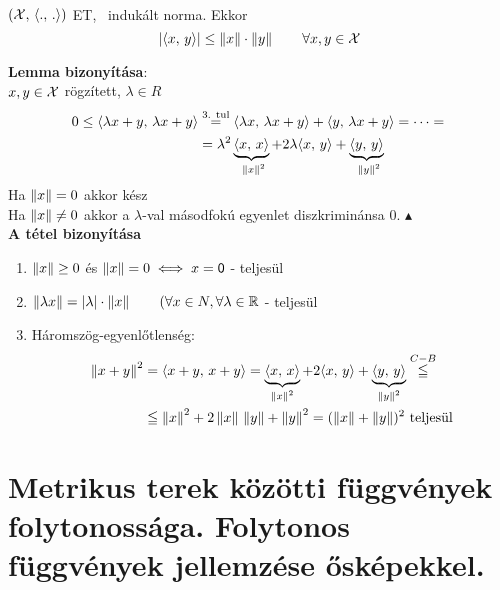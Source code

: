 \begin{biz}
  \begin{lemma}\ \\
    $(\mathcal{X},\,\langle.,\,.\rangle)$ ET, \Norma\ indukált norma. Ekkor
    \[\left|\langle x,\,y\rangle\right| \leq \left\Vert x\right\Vert\cdot\left\Vert y\right\Vert\qquad \forall x,y\in\mathcal{X}\] 
  \end{lemma}
  \textbf{Lemma bizonyítása}:\\
  $x,y\in\mathcal{X}$ rögzített, $\lambda \in R$
  \[
  \begin{split}
    0 \leq \langle\lambda x+y,\,\lambda x+y\rangle &\overset{\text{3. tul}}=
    \langle\lambda x,\,\lambda x +y\rangle + \langle y,\,\lambda x +y\rangle = \dotsb ={}\\
    &=  \lambda^2 \underbrace{\langle x,\, x\rangle}_{\ \left\Vert x\right\Vert^2} + 2\lambda\langle x,\,y\rangle +
    \underbrace{\langle y,\,y\rangle}_{\ \left\Vert y\right\Vert^2}
  \end{split}
  \]
  Ha $\left\Vert x\right\Vert = 0$ akkor kész\\
  Ha $\left\Vert x\right\Vert \ne 0$ akkor a $\lambda$-val másodfokú egyenlet diszkriminánsa 0. \hfill$\blacktriangle$\\

  \textbf{A tétel bizonyítása}
  \begin{enumerate}[\qquad(i)]
  \item $\left\Vert x\right\Vert \geq 0$ és $\left\Vert x\right\Vert =0 \iff x = \mathsf{0}$ - teljesül
  \item $\left\Vert \lambda x\right\Vert = |\lambda| \cdot \left\Vert x\right\Vert\qquad(\forall x \in N, \forall \lambda\in \mathbb{R}$ - teljesül
  \item Háromszög-egyenlőtlenség:\\
    \[ \begin{split}
      \left\Vert x+y\right\Vert^2 &= \langle x+y,\,x+y\rangle = \underbrace{\langle x,\,x\rangle}_{\left\Vert x\right\Vert^2} + 2\langle x,\,y\rangle + \underbrace{
	\langle y,\,y\rangle}_{\left\Vert y\right\Vert^2} \overset{C-B}{\leqq} {}\\
      & \leqq \left\Vert x\right\Vert^2 + 2\left\Vert x\right\Vert\,\left\Vert y\right\Vert + \left\Vert y\right\Vert^2 = (\left\Vert x\right\Vert+\left\Vert y\right\Vert)^2 \text { teljesül}
    \end{split} \]
  \end{enumerate}     
\end{biz}

\newpage
\section{Metrikus terek közötti függvények folytonossága. Folytonos függvények jellemzése ősképekkel.}

